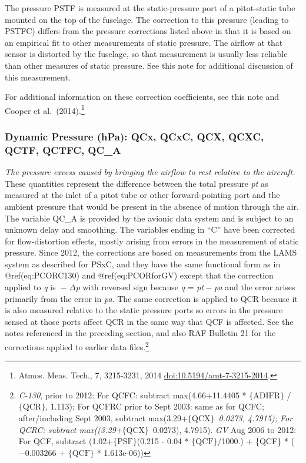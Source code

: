 \documentclass[
  english,
]{book}
\begin{document}
The pressure PSTF is measured at the static-pressure port of a
pitot-static tube mounted on the top of the fuselage. The correction to
this pressure (leading to PSTFC) differs from the pressure corrections
listed above in that it is based on an empirical fit to other
measurements of static pressure. The airflow at that sensor is distorted
by the fuselage, so that measurement is usually less reliable than other
measures of static pressure. See this note for additional discussion of
this measurement.

For additional information on these correction coefficients, see this
note and Cooper et al.~(2014).\footnote{Atmos. Meas. Tech., 7,
  3215-3231, 2014 \url{doi:10.5194/amt-7-3215-2014}.}

\hypertarget{qcx}{%
\subsubsection*{Dynamic Pressure (hPa): QCx, QCxC, QCX, QCXC, QCTF,
QCTFC, QC\_A}\label{qcx}}

\emph{The pressure excess caused by bringing the airflow to rest
relative to the aircraft.} These quantities represent the difference
between the total pressure {\emph{p}\emph{t}} as measured at the inlet
of a pitot tube or other forward-pointing port and the ambient pressure
that would be present in the absence of motion through the air. The
variable QC\_A is provided by the avionic data system and is subject to
an unknown delay and smoothing. The variables ending in ``C'' have been
corrected for flow-distortion effects, mostly arising from errors in the
measurement of static pressure. Since 2012, the corrections are based on
measurements from the LAMS system as described for PSxC, and they have
the same functional form as in @ref(eq:PCORC130) and @ref(eq:PCORforGV)
except that the correction applied to {\emph{q}} is { − \emph{Δp}} with
reversed sign because {\emph{q} = \emph{p}\emph{t} − \emph{p}\emph{a}}
and the error arises primarily from the error in {\emph{p}\emph{a}}. The
same correction is applied to QCR because it is also measured relative
to the static pressure ports so errors in the pressure sensed at those
ports affect QCR in the same way that QCF is affected. See the notes
referenced in the preceding section, and also RAF Bulletin 21 for the
corrections applied to earlier data files.\footnote{\emph{C-130}, prior
  to 2012: For QCFC: subtract max(4.66+11.4405 * \(\mathrm{\{ADIFR\}}\)
  / \(\mathrm{\{QCR\}}\), 1.113); For QCFRC prior to Sept 2003: same as
  for QCFC; after/including Sept 2003, subtract
  max(3.29+\(\mathrm{\{QCX\}}\) \emph{ 0.0273, 4.7915); For QCRC:
  subtract max((3.29+\(\mathrm{\{QCX\}}\) } 0.0273), 4.7915). \emph{GV}
  Aug 2006 to 2012: For QCF, subtract (1.02+\(\mathrm{\{PSF\}}\)(0.215 -
  0.04 * \(\mathrm{\{QCF\}}\)/1000.) + \{QCF\} * (\(-0.003266\) +
  \(\mathrm{\{QCF\}}\) * 1.613e-06))}
\end{document}
